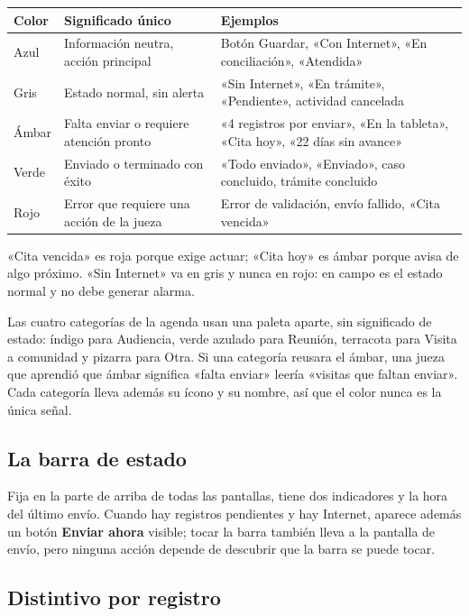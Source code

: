 \documentclass[11pt,a4paper]{article}
\begin{document}
\begin{center}
\begin{tabular}{@{}p{2.2cm}p{6.2cm}p{6.6cm}@{}}
\toprule
\textbf{Color} & \textbf{Significado único} & \textbf{Ejemplos} \\
\midrule
Azul & Información neutra, acción principal & Botón Guardar, «Con Internet», «En conciliación», «Atendida» \\
Gris & Estado normal, sin alerta & «Sin Internet», «En trámite», «Pendiente», actividad cancelada \\
Ámbar & Falta enviar o requiere atención pronto & «4 registros por enviar», «En la tableta», «Cita hoy», «22 días sin avance» \\
Verde & Enviado o terminado con éxito & «Todo enviado», «Enviado», caso concluido, trámite concluido \\
Rojo & Error que requiere una acción de la jueza & Error de validación, envío fallido, «Cita vencida» \\
\bottomrule
\end{tabular}
\end{center}

«Cita vencida» es roja porque exige actuar; «Cita hoy» es ámbar porque avisa de algo próximo. «Sin Internet» va en gris y nunca en rojo: en campo es el estado normal y no debe generar alarma.

Las cuatro categorías de la agenda usan una paleta aparte, sin significado de estado: índigo para Audiencia, verde azulado para Reunión, terracota para Visita a comunidad y pizarra para Otra. Si una categoría reusara el ámbar, una jueza que aprendió que ámbar significa «falta enviar» leería «visitas que faltan enviar». Cada categoría lleva además su ícono y su nombre, así que el color nunca es la única señal.

\subsection{La barra de estado}

Fija en la parte de arriba de todas las pantallas, tiene dos indicadores y la hora del último envío. Cuando hay registros pendientes y hay Internet, aparece además un botón \textbf{Enviar ahora} visible; tocar la barra también lleva a la pantalla de envío, pero ninguna acción depende de descubrir que la barra se puede tocar.



\subsection{Distintivo por registro}
\end{document}
